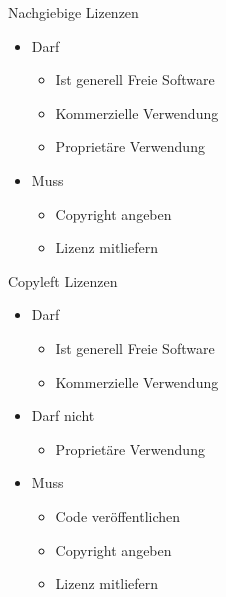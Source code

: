 \begin{frame}{Nachgiebige Lizenzen}
  \begin{itemize}
    \item Darf
    \begin{itemize}
      \item Ist generell Freie Software
      \item Kommerzielle Verwendung
      \item Proprietäre Verwendung
    \end{itemize}
    \item Muss
    \begin{itemize}
      \item Copyright angeben
      \item Lizenz mitliefern
    \end{itemize}
  \end{itemize}
\end{frame}

\begin{frame}{Copyleft Lizenzen}
  \begin{itemize}
    \item Darf
    \begin{itemize}
      \item Ist generell Freie Software
      \item Kommerzielle Verwendung
    \end{itemize}
    \item Darf nicht
    \begin{itemize}
      \item Proprietäre Verwendung
    \end{itemize}
    \item Muss
    \begin{itemize}
      \item Code veröffentlichen
      \item Copyright angeben
      \item Lizenz mitliefern
    \end{itemize}
  \end{itemize}
\end{frame}

